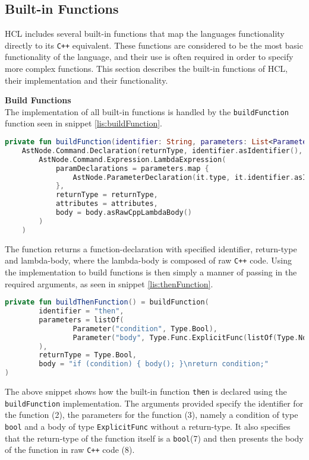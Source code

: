 \subsection{Built-in Functions}
HCL includes several built-in functions that map the languages functionality directly to its \texttt{C++} equivalent. 
These functions are considered to be the most basic functionality of the language, and their use is often required in order to specify more complex functions. 
This section describes the built-in functions of HCL, their implementation and their functionality.

\textbf{Build Functions}\\
The implementation of all built-in functions is handled by the \texttt{buildFunction} function seen in snippet \ref{lis:buildFunction}.

\begin{lstlisting}[language=Kotlin,label=lis:buildFunction,caption=The implementation of buildFunction.]
private fun buildFunction(identifier: String, parameters: List<Parameter>, returnType: Type, body: String, attributes: LambdaExpressionAttributes = BuiltinLambdaAttributes) =
    AstNode.Command.Declaration(returnType, identifier.asIdentifier(),
	    AstNode.Command.Expression.LambdaExpression(
            paramDeclarations = parameters.map {
                AstNode.ParameterDeclaration(it.type, it.identifier.asIdentifier())
            },
            returnType = returnType,
            attributes = attributes,
            body = body.asRawCppLambdaBody()
        )
    )
\end{lstlisting}
The function returns a function-declaration with specified identifier, return-type and lambda-body, where the lambda-body is composed of raw \texttt{C++} code. 
Using the implementation to build functions is then simply a manner of passing in the required arguments, as seen in snippet \ref{lis:thenFunction}.

\begin{lstlisting}[language=Kotlin,label=lis:thenFunction,caption=built-in 'then' function implemented using \texttt{buildFunction}.]
private fun buildThenFunction() = buildFunction(
        identifier = "then",
        parameters = listOf(
                Parameter("condition", Type.Bool),
                Parameter("body", Type.Func.ExplicitFunc(listOf(Type.None))
        ),
        returnType = Type.Bool,
        body = "if (condition) { body(); }\nreturn condition;"
)
\end{lstlisting}
The above snippet shows how the built-in function \texttt{then} is declared using the \texttt{buildFunction} implementation. 
The arguments provided specify the identifier for the function (2), the parameters for the function (3), namely a condition of type \texttt{bool} and a body of type \texttt{ExplicitFunc} without a return-type.
It also specifies that the return-type of the function itself is a \texttt{bool}(7) and then presents the body of the function in raw \texttt{C++} code (8). 

